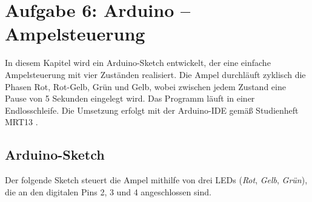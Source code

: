 

\section{Aufgabe 6: Arduino – Ampelsteuerung}
In diesem Kapitel wird ein Arduino-Sketch entwickelt, der eine einfache Ampelsteuerung mit vier Zuständen realisiert.  
Die Ampel durchläuft zyklisch die Phasen Rot, Rot-Gelb, Grün und Gelb, wobei zwischen jedem Zustand eine Pause von 5 Sekunden eingelegt wird.  
Das Programm läuft in einer Endlosschleife.
Die Umsetzung erfolgt mit der Arduino-IDE gemäß Studienheft MRT13 \cite{3}.
\subsection{Arduino-Sketch}
Der folgende Sketch steuert die Ampel mithilfe von drei LEDs (\textit{Rot}, \textit{Gelb}, \textit{Grün}), die an den digitalen Pins 2, 3 und 4 angeschlossen sind.

\begin{minipage}[t]{0.48\textwidth}
    
\end{minipage}
\hfill
\begin{minipage}[t]{0.48\textwidth}
    
\end{minipage}
\begin{minipage}{\linewidth}
    \label{lst:ampel}
\end{minipage}

